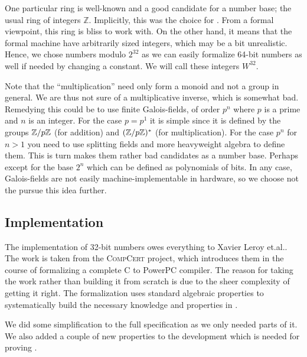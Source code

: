 One particular ring is well-known and a good candidate for a number
base; the usual ring of integers $\mathbb{Z}$. Implicitly,
this was the choice for \janusz{}. From a formal viewpoint, this ring
is bliss to work with. On the other hand, it means that the formal
machine have arbitrarily sized integers, which may be a bit
unrealistic. Hence, we chose numbers modulo $2^{32}$ as we can easily
formalize 64-bit numbers as well if needed by changing a constant. We
will call these integers $W^{32}$.

\begin{rem}
  Note that the ``multiplication'' need only form a monoid and not a
  group in general. We are thus not sure of a multiplicative inverse,
  which is somewhat bad. Remedying this could be to use finite
  Galois-fields, of order $p^n$ where $p$ is a prime and $n$ is an
  integer. For the case $p = p^1$ it is simple since it is defined by
  the groups $\mathbb{Z} / p\mathbb{Z}$ (for addition) and $(\mathbb{Z} / p\mathbb{Z})^{*}$ (for
  multiplication). For the case $p^n$ for $n > 1$ you need to use
  splitting fields and more heavyweight algebra to define them. This
  is turn makes them rather bad candidates as a number base. Perhaps
  except for the base $2^n$ which can be defined as polynomials of
  bits. In any case, Galois-fields are not easily
  machine-implementable in hardware, so we choose not the pursue this
  idea further.
\end{rem}

\subsection{\coq{} Implementation}

The \coq{} implementation of 32-bit numbers owes everything to Xavier
Leroy et.al.\cite{leroy:compcert}. The work is taken from the
\textsc{CompCert} project, which introduces them in the course of
formalizing a complete C to PowerPC compiler. The reason for taking
the work rather than building it from scratch is due to the sheer
complexity of getting it right. The formalization uses standard
algebraic properties to systematically build the necessary knowledge
and properties in \coq{}.

We did some simplification to the full specification as we only needed
parts of it. We also added a couple of new properties to the
development which is needed for proving \januso{}.

